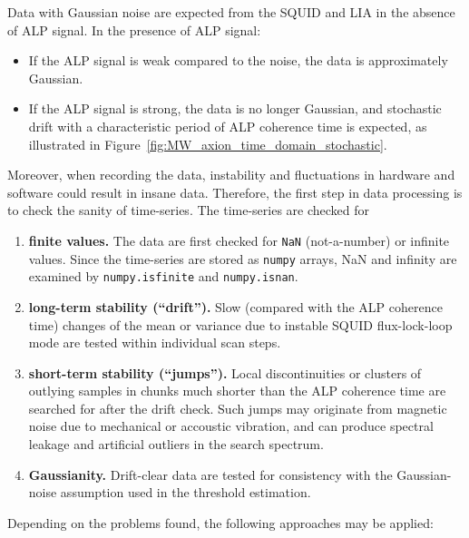 Data with Gaussian noise are expected from the SQUID and LIA in the absence of ALP signal. 
In the presence of ALP signal:
\begin{itemize}
    \item If the ALP signal is weak compared to the noise, the data is approximately Gaussian. 
    \item If the ALP signal is strong, the data is no longer Gaussian, and stochastic drift with a characteristic period of ALP coherence time is expected, as illustrated in Figure~\ref{fig:MW_axion_time_domain_stochastic}. %
\end{itemize}
Moreover, when recording the data, instability and fluctuations in hardware and software could result in insane data. 
Therefore, the first step in data processing is to check the sanity of time-series. 
The time-series are checked for
\begin{enumerate}
    \item \textbf{finite values.} The data are first checked for \texttt{NaN} (not-a-number) or infinite values. Since the time-series are stored as \texttt{numpy} arrays, NaN and infinity are examined by \texttt{numpy.isfinite} and \texttt{numpy.isnan}. 
    \item \textbf{long-term stability (``drift'').} Slow (compared with the ALP coherence time) changes of the mean or variance due to instable SQUID flux-lock-loop mode are tested within individual scan steps. 
    \item \textbf{short-term stability (``jumps'').} Local discontinuities or clusters of outlying samples in chunks much shorter than the ALP coherence time are searched for after the drift check. Such jumps may originate from magnetic noise due to mechanical or accoustic vibration, and can produce spectral leakage and artificial outliers in the search spectrum. 
    \item \textbf{Gaussianity.} Drift-clear data are tested for consistency with the Gaussian-noise assumption used in the threshold estimation. 
\end{enumerate}
Depending on the problems found, the following approaches may be applied:
